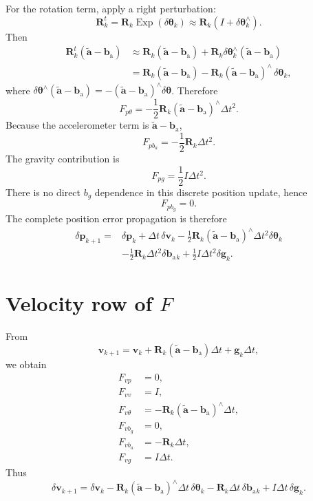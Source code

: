 \documentclass[11pt]{article}
\newcommand{\R}{\mathbf{R}}
\newcommand{\p}{\mathbf{p}}
\newcommand{\vct}{\mathbf{v}}
\newcommand{\ba}{\mathbf{b}_{\mathrm{a}}}
\newcommand{\g}{\mathbf{g}}
\newcommand{\Exp}{\operatorname{Exp}}
\newcommand{\skewop}[1]{#1^{\wedge}}
\newcommand{\atilde}{\tilde{\mathbf{a}}}
\begin{document}
For the rotation term, apply a right perturbation:
\begin{equation}
\R_k^t=\R_k\Exp(\delta\bm\theta_k)
\approx \R_k(I+\skewop{\delta\bm\theta_k}).
\end{equation}
Then
\begin{align}
\R_k^t(\atilde-\ba)
&\approx \R_k(\atilde-\ba)+\R_k\skewop{\delta\bm\theta_k}(\atilde-\ba)\\
&=\R_k(\atilde-\ba)-\R_k\skewop{(\atilde-\ba)}\,\delta\bm\theta_k,
\end{align}
where $\skewop{\delta\bm\theta}(\atilde-\ba)=-\skewop{(\atilde-\ba)}\delta\bm\theta$. Therefore
\begin{equation}
\boxed{F_{p\theta}=-\frac12\R_k\skewop{(\atilde-\ba)}\Delta t^2.}
\end{equation}
Because the accelerometer term is $\atilde-\ba$,
\begin{equation}
\boxed{F_{pb_a}=-\frac12\R_k\Delta t^2.}
\end{equation}
The gravity contribution is
\begin{equation}
\boxed{F_{pg}=\frac12I\Delta t^2.}
\end{equation}
There is no direct $b_g$ dependence in this discrete position update, hence
\begin{equation}
F_{pb_g}=0.
\end{equation}
The complete position error propagation is therefore
\begin{align}
\delta\p_{k+1}
={}&\delta\p_k+\Delta t\,\delta\vct_k
-\frac12\R_k\skewop{(\atilde-\ba)}\Delta t^2\delta\bm\theta_k\\
&-\frac12\R_k\Delta t^2\delta\ba{}_k
+\frac12I\Delta t^2\delta\g_k.
\end{align}

\section{Velocity row of $F$}
From
\begin{equation}
\vct_{k+1}=\vct_k+\R_k(\atilde-\ba)\Delta t+\g_k\Delta t,
\end{equation}
we obtain
\begin{align}
F_{vp}&=0,\\
F_{vv}&=I,\\
\boxed{F_{v\theta}}&=\boxed{-\R_k\skewop{(\atilde-\ba)}\Delta t},\\
F_{vb_g}&=0,\\
\boxed{F_{vb_a}}&=\boxed{-\R_k\Delta t},\\
\boxed{F_{vg}}&=\boxed{I\Delta t}.
\end{align}
Thus
\begin{equation}
\delta\vct_{k+1}
=\delta\vct_k
-\R_k\skewop{(\atilde-\ba)}\Delta t\,\delta\bm\theta_k
-\R_k\Delta t\,\delta\ba{}_k
+I\Delta t\,\delta\g_k.
\end{equation}
\end{document}
